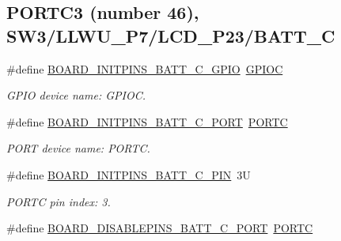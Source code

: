 \subsection*{P\+O\+R\+T\+C3 (number 46), S\+W3/\+L\+L\+W\+U\+\_\+\+P7/\+L\+C\+D\+\_\+\+P23/\+B\+A\+T\+T\+\_\+C}
\begin{DoxyCompactItemize}
\item 
\mbox{\label{group__pin__mux_ga6964c832251c6312dd115e08f08e1535}} 
\#define \mbox{\hyperlink{group__pin__mux_ga6964c832251c6312dd115e08f08e1535}{B\+O\+A\+R\+D\+\_\+\+I\+N\+I\+T\+P\+I\+N\+S\+\_\+\+B\+A\+T\+T\+\_\+\+C\+\_\+\+G\+P\+IO}}~\mbox{\hyperlink{group___g_p_i_o___peripheral___access___layer_ga2dca03332d620196ba943bc2346eaa08}{G\+P\+I\+OC}}
\begin{DoxyCompactList}\small\item\em G\+P\+IO device name\+: G\+P\+I\+OC. \end{DoxyCompactList}\item 
\mbox{\label{group__pin__mux_gad2fea136498eaafa53a55d7ebc228e87}} 
\#define \mbox{\hyperlink{group__pin__mux_gad2fea136498eaafa53a55d7ebc228e87}{B\+O\+A\+R\+D\+\_\+\+I\+N\+I\+T\+P\+I\+N\+S\+\_\+\+B\+A\+T\+T\+\_\+\+C\+\_\+\+P\+O\+RT}}~\mbox{\hyperlink{group___p_o_r_t___peripheral___access___layer_ga68fea88642279a70246e026e7221b0a5}{P\+O\+R\+TC}}
\begin{DoxyCompactList}\small\item\em P\+O\+RT device name\+: P\+O\+R\+TC. \end{DoxyCompactList}\item 
\mbox{\label{group__pin__mux_ga9c99a95805cd526dd953c2066725c9db}} 
\#define \mbox{\hyperlink{group__pin__mux_ga9c99a95805cd526dd953c2066725c9db}{B\+O\+A\+R\+D\+\_\+\+I\+N\+I\+T\+P\+I\+N\+S\+\_\+\+B\+A\+T\+T\+\_\+\+C\+\_\+\+P\+IN}}~3U
\begin{DoxyCompactList}\small\item\em P\+O\+R\+TC pin index\+: 3. \end{DoxyCompactList}\item 
\mbox{\label{group__pin__mux_gad596d7a61e566e3f2c2944ee62afc45d}} 
\#define \mbox{\hyperlink{group__pin__mux_gad596d7a61e566e3f2c2944ee62afc45d}{B\+O\+A\+R\+D\+\_\+\+D\+I\+S\+A\+B\+L\+E\+P\+I\+N\+S\+\_\+\+B\+A\+T\+T\+\_\+\+C\+\_\+\+P\+O\+RT}}~\mbox{\hyperlink{group___p_o_r_t___peripheral___access___layer_ga68fea88642279a70246e026e7221b0a5}{P\+O\+R\+TC}}

\end{DoxyCompactItemize}
